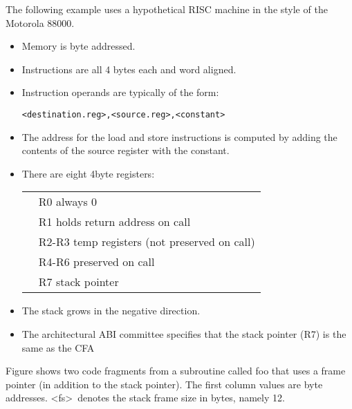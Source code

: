 The following example uses a hypothetical RISC machine in
the style of the Motorola 88000.
\begin{itemize}
\item Memory is byte addressed.

\item Instructions are all 4 bytes each and word aligned.

\item Instruction operands are typically of the form:
\begin{alltt}
    <destination.reg>, <source.reg>, <constant>
\end{alltt}

\item The address for the load and store instructions is computed
by adding the contents of the
source register with the constant.

\item There are eight 4\dash byte registers:
\newline
\begin{tabular}{p{5mm}l}
   & R0 always 0 \\
   & R1 holds return address on call \\
   & R2-R3 temp registers (not preserved on call) \\
   & R4-R6 preserved on call \\
   & R7 stack pointer \\
\end{tabular}

\item  The stack grows in the negative direction.

\item The architectural ABI committee specifies that the
stack pointer (R7) is the same as the CFA

\end{itemize}

Figure 
shows two code fragments from a subroutine called
foo that uses a frame pointer (in addition to the stack
pointer). The first column values are byte addresses. 
\textless fs\textgreater\ denotes the stack frame size in bytes, namely 12.


